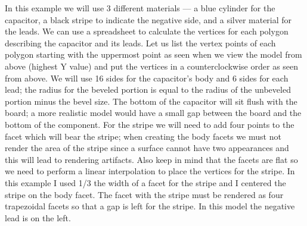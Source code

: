 \documentclass[a4paper, dvipdfm]{article}
\begin{document}
In this example we will use 3 different materials --- a blue cylinder for the capacitor, a black stripe to
indicate the negative side, and a silver material for the leads. We can use a spreadsheet to calculate the
vertices for each polygon describing the capacitor and its leads. Let us list the vertex points of each
polygon starting with the uppermost point as seen when we view the model from above (highest Y value) and
put the vertices in a counterclockwise order as seen from above.
We will use 16 sides for the capacitor's body and 6 sides for each lead; the radius for the beveled portion is
equal to the radius of the unbeveled portion minus the bevel size. The bottom of the capacitor will sit flush
with the board; a more realistic model would have a small gap between the board and the bottom of the
component. For the stripe we will need to add four points to the facet which will bear the stripe; when creating
the body facets we must not render the area of the stripe since a surface cannot have two appearances and this
will lead to rendering artifacts. Also keep in mind that the facets are flat so we need to perform a linear
interpolation to place the vertices for the stripe.  In this example I used 1/3 the width of a facet for the stripe
and I centered the stripe on the body facet. The facet with the stripe must be rendered as four trapezoidal facets
so that a gap is left for the stripe. In this model the negative lead is on the left.
\end{document}
